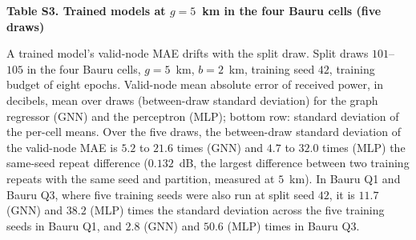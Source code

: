 \documentclass[10pt,a4paper]{article}
\newcommand{\tabajusta}[1]{\sbox{\tabcaixa}{#1}\ifdim\wd\tabcaixa>\linewidth\resizebox{\linewidth}{!}{\usebox{\tabcaixa}}\else\usebox{\tabcaixa}\fi}
\begin{document}
{\large\bfseries Table S3. Trained models at $g = 5$~km in the four Bauru cells (five draws)}

\medskip
\small
A trained model's valid-node MAE drifts with the split draw. Split draws $101$--$105$ in the four Bauru cells, $g = 5$~km, $b = 2$~km, training seed $42$, training budget of eight epochs. Valid-node mean absolute error of received power, in decibels, mean over draws (between-draw standard deviation) for the graph regressor (GNN) and the perceptron (MLP); bottom row: standard deviation of the per-cell means. Over the five draws, the between-draw standard deviation of the valid-node MAE is $5.2$ to $21.6$ times (GNN) and $4.7$ to $32.0$ times (MLP) the same-seed repeat difference ($0.132$~dB, the largest difference between two training repeats with the same seed and partition, measured at $5$~km). In Bauru Q1 and Bauru Q3, where five training seeds were also run at split seed $42$, it is $11.7$ (GNN) and $38.2$ (MLP) times the standard deviation across the five training seeds in Bauru Q1, and $2.8$ (GNN) and $50.6$ (MLP) times in Bauru Q3.

\medskip
\centering
\tabajusta{}
\end{document}
